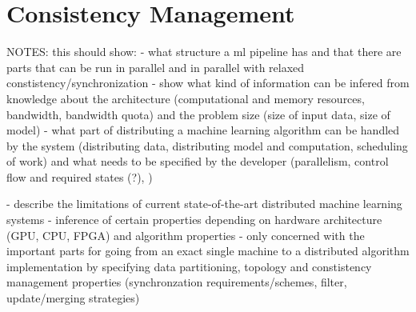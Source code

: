 
\chapter{Consistency Management}
\label{c:consistency_mgmt}

NOTES:
this should show:
	- what structure a ml pipeline has and that there are parts that can be run in parallel and in parallel with relaxed constistency/synchronization
	- show what kind of information can be infered from knowledge about the architecture (computational and memory resources, bandwidth, bandwidth quota) and the problem size (size of input data, size of model)
	- what part of distributing a machine learning algorithm can be handled by the system (distributing data, distributing model and computation, scheduling of work) and what needs to be specified by the developer (parallelism, control flow and required states (?), )

- describe the limitations of current state-of-the-art distributed machine learning systems
	- inference of certain properties depending on hardware architecture (GPU, CPU, FPGA) and algorithm properties
	- only concerned with the important parts for going from an exact single machine to a distributed algorithm implementation by specifying data partitioning, topology and constistency management properties (synchronzation requirements/schemes, filter, update/merging strategies)
	